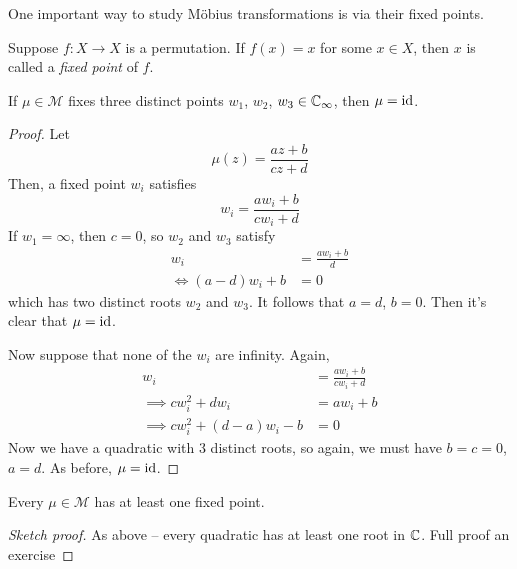 \documentclass{../template/note}
\begin{document}
    One important way to study M\"obius transformations is via their fixed points.

    \begin{definition}
        Suppose \(f: X \to X\) is a permutation. If \(f(x) = x\) for some \(x \in X\), then \(x\) is called a \emph{fixed point} of \(f\).
    \end{definition}
    
    \begin{lemma}
        If \(\mu \in \mathcal M\) fixes three distinct points \(w_1\), \(w_2\), \(w_3 \in \mathbb C_\infty\), then \(\mu = \operatorname{id}\).
    \end{lemma}
    
    \begin{proof}
        Let
        \[
            \mu(z) = \frac{az+b}{cz+d}
        \]
        Then, a fixed point \(w_i\) satisfies
        \[
            w_i = \frac{aw_i + b}{cw_i + d}
        \]
        If \(w_1 = \infty\), then \(c = 0\), so \(w_2\) and \(w_3\) satisfy
        \begin{align*}
            w_i &= \frac{aw_i + b}{d} \\
            \iff (a-d)w_i + b &= 0
        \end{align*}
        which has two distinct roots \(w_2\) and \(w_3\). It follows that \(a = d\), \(b = 0\). Then it's clear that \(\mu = \operatorname{id}\).

        Now suppose that none of the \(w_i\) are infinity. Again,
        \begin{align*}
            w_i &= \frac{aw_i + b}{cw_i + d} \\
            \implies cw_i^2 + dw_i &= aw_i + b \\
            \implies cw_i^2 + (d-a)w_i - b &= 0
        \end{align*}
        Now we have a quadratic with 3 distinct roots, so again, we must have \(b = c = 0\), \(a = d\). As before, \(\mu = \operatorname{id}\).
    \end{proof}
    
    \begin{proposition}
        Every \(\mu \in \mathcal M\) has at least one fixed point.
    \end{proposition}

    \begin{proof}[Sketch proof]
        As above -- every quadratic has at least one root in \(\mathbb C\). Full proof an exercise
    \end{proof}
    
\end{document}
